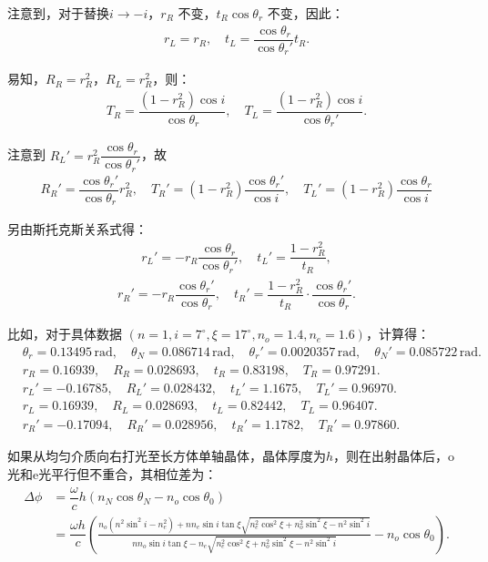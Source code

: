 注意到，对于替换\(i \to -i\)，\(r_R\) 不变，\(t_R \cos\theta_r\) 不变，因此：
\begin{align*}
	r_L = r_R, \quad t_L = \dfrac{\cos\theta_r}{\cos\theta_r'} t_R.
\end{align*}

易知，\(R_R = r_R^2\)，\(R_L = r_R^2\)，则：
\begin{align*}
	T_R = \dfrac{(1 - r_R^2) \cos i}{\cos\theta_r}, \quad T_L = \dfrac{(1 - r_R^2) \cos i}{\cos\theta_r'}.
\end{align*}

注意到 \(R_L' = r_R^2 \dfrac{\cos\theta_r}{\cos\theta_r'}\)，故 \begin{align*}
	R_R' = \dfrac{\cos\theta_r'}{\cos\theta_r} r_R^2,\quad T_R' = (1 - r_R^2) \dfrac{\cos\theta_r'}{\cos i},\quad T_L' = (1 - r_R^2) \dfrac{\cos\theta_r}{\cos i}
\end{align*}

另由斯托克斯关系式得：
\begin{align*}
	r_L' = -r_R \dfrac{\cos\theta_r}{\cos\theta_r'}, \quad t_L' = \dfrac{1 - r_R^2}{t_R},
\end{align*}
\begin{align*}
	r_R' = -r_R \dfrac{\cos\theta_r'}{\cos\theta_r}, \quad t_R' = \dfrac{1 - r_R^2}{t_R} \cdot \dfrac{\cos\theta_r'}{\cos\theta_r}.
\end{align*}


比如，对于具体数据 \((n = 1, i = 7^\circ, \xi = 17^\circ, n_o = 1.4, n_e = 1.6)\)，计算得：
\begin{align*}
	&\theta_r = 0.13495 \, \text{rad}, \quad \theta_N = 0.086714 \, \text{rad}, \quad \theta_r' = 0.0020357 \, \text{rad}, \quad \theta_N' = 0.085722 \, \text{rad}.\\
	&r_R = 0.16939, \quad R_R = 0.028693, \quad t_R = 0.83198, \quad T_R = 0.97291.\\
	&r_L' = -0.16785, \quad R_L' = 0.028432, \quad t_L' = 1.1675, \quad T_L' = 0.96970.\\
	&r_L = 0.16939, \quad R_L = 0.028693, \quad t_L = 0.82442, \quad T_L = 0.96407.\\
	&r_R' = -0.17094, \quad R_R' = 0.028956, \quad t_R' = 1.1782, \quad T_R' = 0.97860.
\end{align*}

如果从均匀介质向右打光至长方体单轴晶体，晶体厚度为\(h\)，则在出射晶体后，o光和e光平行但不重合，其相位差为：
\begin{align*}
	\Delta\phi & = \dfrac{\omega}{c} h \left( n_N \cos\theta_N - n_o \cos\theta_0 \right)                                                                                                                                                                                                  \\
	           & =\dfrac{\omega h}{c} \left( \frac{n_o \left( n^2 \sin^2 i - n_e^2 \right) + n n_e \sin i \tan\xi \sqrt{n_e^2 \cos^2\xi + n_o^2 \sin^2\xi - n^2 \sin^2 i}}{n n_o \sin i \tan\xi - n_e \sqrt{n_e^2 \cos^2\xi + n_o^2 \sin^2\xi - n^2 \sin^2 i}} - n_o \cos\theta_0 \right).
\end{align*}

